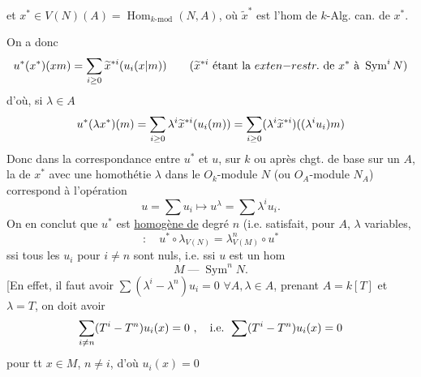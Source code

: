 et $x^*\in V(N)(A)=\operatorname{Hom}_{k\text{-mod}}(N,A)$,
où $\widetilde{x}^*$ est l'hom de $k$-Alg.  can. de $x^*$.

On a donc
\[
u^*(x^*)({{x}}{m})=
\sum_{i\geq0}\widetilde{x}^{*i}(u_i({x|m}))
\qquad(\widetilde{x}^{*i}\text{ étant la }{{exten-}}{restr.}\text{ de }x^*\text{ à }\operatorname{Sym}^iN)
\]
d'où, si $\lambda\in A$
\[
u^*(\lambda x^*)(m)=\sum_{i\geq0}\lambda^i\widetilde{x}^{*i}(u_i(m))
=\sum_{i\geq0}({{\lambda^i}}\widetilde{x}^{*i}){((\lambda^iu_i)m)}
\]
Donc dans la correspondance entre $u^*$ et $u$, sur $k$ ou après chgt. de base sur un $A$, la   de $x^*$ avec une homothétie  $\lambda$ dans le $O_k$-module $N$ (ou $O_A$-module $N_A$) correspond à l'opération
\[
u=\sum u_i\longmapsto u^\lambda=\sum\lambda^iu_i.
\]
On en conclut que $u^*$ est \uline{homogène de} degré $n$ (i.e. satisfait, pour $A$, $\lambda$ variables,
\[
:\quad u^*\circ\lambda_{V(N)}=\lambda^n_{V(M)}\circ u^*
\]
ssi tous les $u_i$ pour $i\neq n$ sont nuls, i.e. ssi $u$ est un hom
\[
M\mathbin{\text{---}}\operatorname{Sym}^nN.
\]
[En effet, il faut avoir $\sum(\lambda^i-\lambda^n)u_i=0$ $\forall A,\lambda\in A$, prenant $A=k[T]$ et $\lambda=T$, on doit avoir
\[
\sum_{i\neq n}(T^i-T^n)u_i{(x)}=0\ ,\quad
\text{i.e. }\sum(T^i-T^n)u_i(x)=0
\]
pour tt $x\in M$, $n\neq i$, d'où  $u_i(x)=0$
